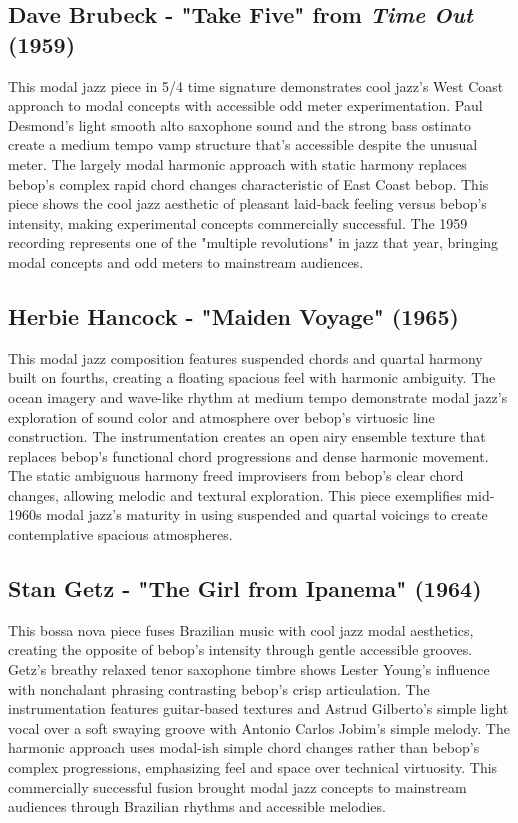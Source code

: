 \documentclass[11pt]{article}
\begin{document}
\subsection*{Dave Brubeck - "Take Five" from \emph{Time Out} (1959)}
This modal jazz piece in 5/4 time signature demonstrates cool jazz's West Coast approach to modal concepts with accessible odd meter experimentation. Paul Desmond's light smooth alto saxophone sound and the strong bass ostinato create a medium tempo vamp structure that's accessible despite the unusual meter. The largely modal harmonic approach with static harmony replaces bebop's complex rapid chord changes characteristic of East Coast bebop. This piece shows the cool jazz aesthetic of pleasant laid-back feeling versus bebop's intensity, making experimental concepts commercially successful. The 1959 recording represents one of the "multiple revolutions" in jazz that year, bringing modal concepts and odd meters to mainstream audiences.

\subsection*{Herbie Hancock - "Maiden Voyage" (1965)}
This modal jazz composition features suspended chords and quartal harmony built on fourths, creating a floating spacious feel with harmonic ambiguity. The ocean imagery and wave-like rhythm at medium tempo demonstrate modal jazz's exploration of sound color and atmosphere over bebop's virtuosic line construction. The instrumentation creates an open airy ensemble texture that replaces bebop's functional chord progressions and dense harmonic movement. The static ambiguous harmony freed improvisers from bebop's clear chord changes, allowing melodic and textural exploration. This piece exemplifies mid-1960s modal jazz's maturity in using suspended and quartal voicings to create contemplative spacious atmospheres.

\subsection*{Stan Getz - "The Girl from Ipanema" (1964)}
This bossa nova piece fuses Brazilian music with cool jazz modal aesthetics, creating the opposite of bebop's intensity through gentle accessible grooves. Getz's breathy relaxed tenor saxophone timbre shows Lester Young's influence with nonchalant phrasing contrasting bebop's crisp articulation. The instrumentation features guitar-based textures and Astrud Gilberto's simple light vocal over a soft swaying groove with Antonio Carlos Jobim's simple melody. The harmonic approach uses modal-ish simple chord changes rather than bebop's complex progressions, emphasizing feel and space over technical virtuosity. This commercially successful fusion brought modal jazz concepts to mainstream audiences through Brazilian rhythms and accessible melodies.
\end{document}
